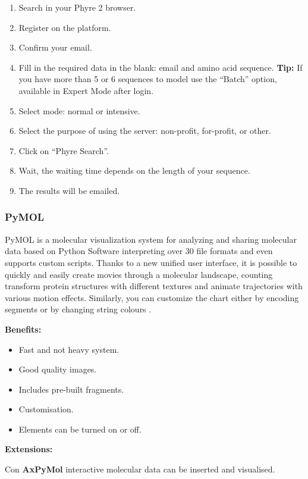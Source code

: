 \documentclass[11pt, letterpaper, english]{article}
\begin{document}
            \begin{enumerate}[1.]
            \item Search in your Phyre 2 browser. 
            \item Register on the platform.
            \item Confirm your email.
            \item Fill in the required data in the blank: email and amino acid sequence. \textbf{Tip:} If you have more than 5 or 6 sequences to model use the “Batch” option, available in Expert Mode after login. 
            \item Select mode: normal or intensive.
            \item Select the purpose of using the server: non-profit, for-profit, or other.
            \item Click on “Phyre Search”.
                   
            \item Wait, the waiting time depends on the length of your sequence.
            \item The results will be emailed.
                   
            \end{enumerate}
        \subsubsection {PyMOL}
        \par{PyMOL is a molecular visualization system for analyzing and sharing molecular data based on Python Software interpreting over 30 file formats and even supports custom scripts. Thanks to a new unified user interface, it is possible to quickly and easily create movies through a molecular landscape, counting transform protein structures with different textures and animate trajectories with various motion effects. Similarly, you can customize the chart either by encoding segments or by changing string colours  \cite{Yuan_2017} }. 
        \par{\textbf{Benefits:}}
            \begin{itemize}
                \item Fast and not heavy system.
                 \item Good quality images.
                 \item Includes pre-built fragments.
                 \item Customisation.
                 \item Elements can be turned on or off.
            \end{itemize}
            \par{\textbf{Extensions:}}
            \par{Con \textbf{AxPyMol} interactive molecular data can be inserted and visualised.}
            
\end{document}
